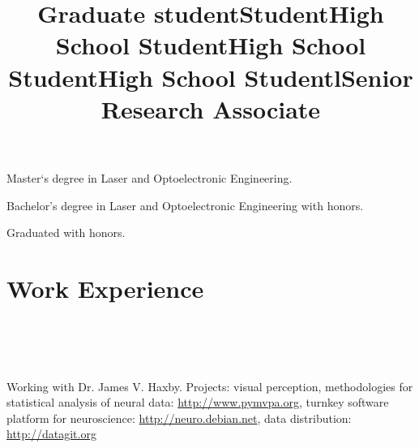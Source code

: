 \documentclass[12pt,overlapped,line]{res}
\begin{document}
\begin{resume}
 \title{Graduate student}
 \begin{position}
  Master`s degree in Laser and Optoelectronic Engineering.
 \end{position}

 \title{Student}
 \begin{position}
  Bachelor's degree in Laser and Optoelectronic Engineering with
  honors.
 \end{position}

 \title{High School Student}
 \begin{position}
  Graduated with honors.
 \end{position}

 \title{High School Student}
 \begin{position}
 \vspace{-2.5em}
 \end{position}

 \title{High School Student}
 \begin{position}
 \end{position}

\vspace{-3em}
 \section{Work Experience}
 \begin{format}
   \title{l}\\
   \\
   \body\\
 \end{format}


\title{Senior Research Associate}
\begin{position}
  Working with Dr. James V. Haxby.  Projects: visual perception,
  methodologies for statistical analysis of neural data:
  \url{http://www.pymvpa.org}, turnkey software platform for neuroscience:
  \url{http://neuro.debian.net}, data distribution: \url{http://datagit.org}
\end{position}


\end{resume}
\end{document}
